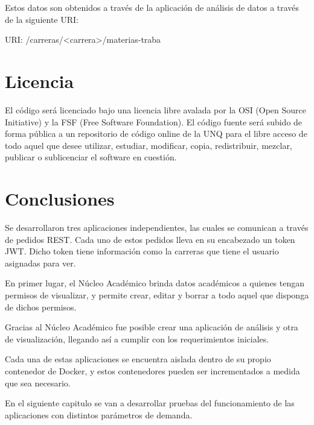 Estos datos son obtenidos a través de la aplicación de análisis de datos a través de la siguiente URI:

URI: /carreras/<carrera>/materias-traba \\


\section{Licencia}
El código será licenciado bajo una licencia libre avalada por la OSI (Open Source Initiative) y la
FSF (Free Software Foundation). El código fuente será subido de forma pública a un repositorio
de código online de la UNQ para el libre acceso de todo aquel que desee utilizar, estudiar,
modificar, copia, redistribuir, mezclar, publicar o sublicenciar el software en cuestión.

\section[Conclusiones]{Conclusiones}

Se desarrollaron tres aplicaciones independientes, las cuales se comunican a través de pedidos REST. Cada uno de estos pedidos lleva en su encabezado un token JWT. Dicho token tiene información como la carreras que tiene el usuario asignadas para ver.

En primer lugar, el Núcleo Académico brinda datos académicos a quienes tengan permisos de visualizar, y permite crear, editar y borrar a todo aquel que disponga de dichos permisos.

Gracias al Núcleo Académico fue posible crear una aplicación de análisis y otra de visualización, llegando así a cumplir con los requerimientos iniciales.

Cada una de estas aplicaciones se encuentra aislada dentro de su propio contenedor de Docker, y estos contenedores pueden ser incrementados a medida que sea necesario.

En el siguiente capitulo se van a desarrollar pruebas del funcionamiento de las aplicaciones con distintos parámetros de demanda.